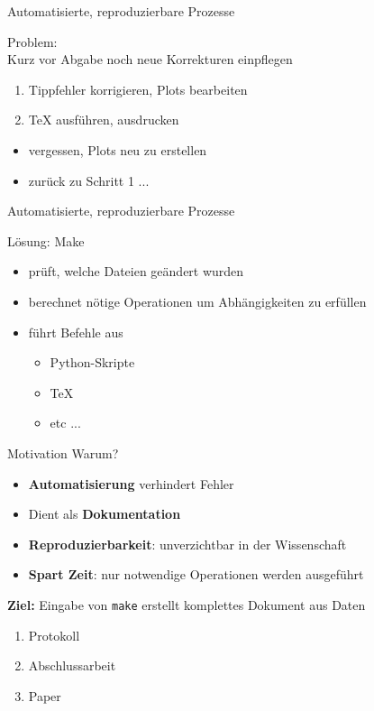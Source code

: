 \begin{frame}{Automatisierte, reproduzierbare Prozesse}

  {\huge Problem:}\\
  \vspace{1em}
  Kurz vor Abgabe noch neue Korrekturen einpflegen
  \begin{enumerate}
    \item Tippfehler korrigieren, Plots bearbeiten
    \item \TeX{} ausführen, ausdrucken
  \end{enumerate}
  \begin{itemize}
    \item vergessen, Plots neu zu erstellen
    \item zurück zu Schritt 1 ...
  \end{itemize}
\end{frame}

\begin{frame}{Automatisierte, reproduzierbare Prozesse}

  {\huge Lösung: Make}
  \vspace{1em}
  \begin{itemize}
    \item prüft, welche Dateien geändert wurden
    \item berechnet nötige Operationen um Abhängigkeiten zu erfüllen
    \item führt Befehle aus
    \begin{itemize}
      \item Python-Skripte
      \item \TeX{}
      \item etc ...
    \end{itemize}
  \end{itemize}
\end{frame}

\begin{frame}{Motivation}
  {\huge Warum?}
  \vspace{1em}
  \begin{itemize}
    \item \textbf{Automatisierung} verhindert Fehler
    \item Dient als \textbf{Dokumentation}
    \item \textbf{Reproduzierbarkeit}: unverzichtbar in der Wissenschaft
    \item \textbf{Spart Zeit}: nur notwendige Operationen werden ausgeführt
  \end{itemize}
  \vspace{1em}
  \textbf{Ziel:} Eingabe von \texttt{make} erstellt komplettes Dokument aus Daten
	\begin{enumerate}
		\item Protokoll
		\item Abschlussarbeit
		\item Paper
	\end{enumerate}
\end{frame}

